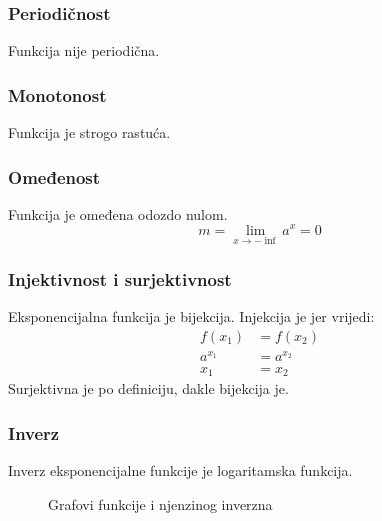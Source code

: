 \subsubsection{Periodičnost \eksp}
    Funkcija nije periodična.

\subsubsection{Monotonost \eksp}
    Funkcija je strogo rastuća.

\subsubsection{Omeđenost \eksp}
    Funkcija je omeđena odozdo nulom.
    \[m = \lim_{x \to -\inf} a^x = 0 \]

\subsubsection{Injektivnost i surjektivnost \eksp}
    Eksponencijalna funkcija je bijekcija. Injekcija je jer vrijedi:
    \begin{equation*}
        \begin{split}
            f(x_1)      &= f(x_2) \\
            a^{x_1}     &= a^{x_2} \\
            x_1         &= x_2
        \end{split}
    \end{equation*}
    Surjektivna je po definiciju, dakle bijekcija je.

\subsubsection{Inverz \eksp}
    Inverz eksponencijalne funkcije je logaritamska funkcija.
    \begin{figure}[ht]
        \centering
        \caption{Grafovi funkcije i njenzinog inverzna}
        \label{fig:template}
    \end{figure}
    \\